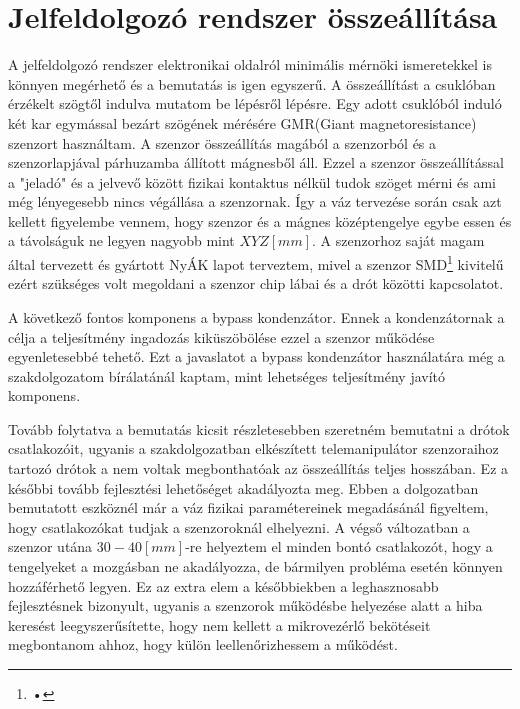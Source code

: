 \section{Jelfeldolgozó rendszer összeállítása}

A jelfeldolgozó rendszer elektronikai oldalról minimális mérnöki ismeretekkel is könnyen megérhető és a bemutatás is igen egyszerű. A összeállítást a csuklóban érzékelt szögtől indulva mutatom be lépésről lépésre. Egy adott csuklóból induló két kar egymással bezárt szögének mérésére GMR(Giant magnetoresistance) szenzort használtam. A szenzor összeállítás magából a szenzorból és a szenzorlapjával párhuzamba állított mágnesből áll. Ezzel a szenzor összeállítással a "jeladó" és a jelvevő között fizikai kontaktus nélkül tudok szöget mérni és ami még lényegesebb nincs végállása a szenzornak. Így a váz tervezése során csak azt kellett figyelembe vennem, hogy szenzor és a mágnes középtengelye egybe essen és a távolságuk ne legyen nagyobb mint $XYZ[mm]$. A szenzorhoz saját magam által tervezett és gyártott NyÁK lapot terveztem, mivel a szenzor SMD\footnote{•} kivitelű ezért szükséges volt megoldani a szenzor chip lábai és a drót közötti kapcsolatot.


A következő fontos komponens a bypass kondenzátor. Ennek a kondenzátornak a célja a teljesítmény ingadozás kiküszöbölése ezzel a szenzor működése egyenletesebbé tehető. Ezt a javaslatot a bypass kondenzátor használatára még a szakdolgozatom bírálatánál kaptam, mint lehetséges teljesítmény javító komponens.

Tovább folytatva a bemutatás kicsit részletesebben szeretném bemutatni a drótok csatlakozóit, ugyanis a szakdolgozatban elkészített telemanipulátor szenzoraihoz tartozó drótok a nem voltak megbonthatóak az összeállítás teljes hosszában. Ez a későbbi tovább fejlesztési lehetőséget akadályozta meg. Ebben a dolgozatban bemutatott eszköznél már a váz fizikai paramétereinek megadásánál figyeltem, hogy csatlakozókat tudjak a szenzoroknál elhelyezni. A végső változatban a szenzor utána $30-40[mm]$-re helyeztem el minden bontó csatlakozót, hogy a tengelyeket a mozgásban ne akadályozza, de bármilyen probléma esetén könnyen hozzáférhető legyen. Ez az extra elem a későbbiekben a leghasznosabb fejlesztésnek bizonyult, ugyanis a szenzorok működésbe helyezése alatt a hiba keresést leegyszerűsítette, hogy nem kellett a mikrovezérlő bekötéseit megbontanom ahhoz, hogy külön leellenőrizhessem a működést.


